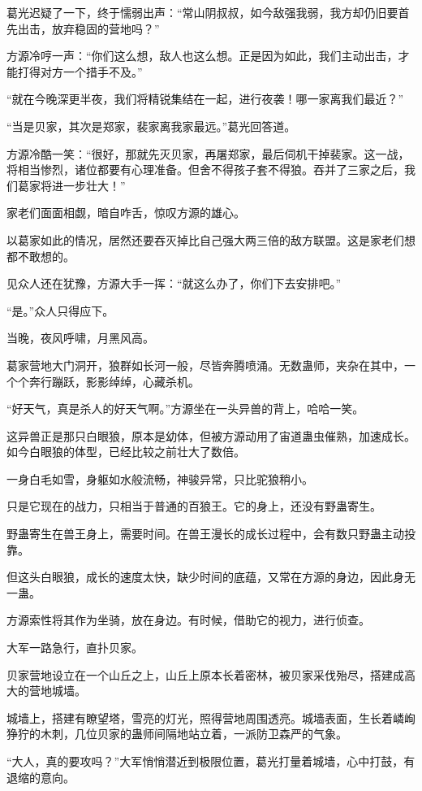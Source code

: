 \begin{this_body}
葛光迟疑了一下，终于懦弱出声：“常山阴叔叔，如今敌强我弱，我方却仍旧要首先出击，放弃稳固的营地吗？”

方源冷哼一声：“你们这么想，敌人也这么想。正是因为如此，我们主动出击，才能打得对方一个措手不及。”

“就在今晚深更半夜，我们将精锐集结在一起，进行夜袭！哪一家离我们最近？”

“当是贝家，其次是郑家，裴家离我家最远。”葛光回答道。

方源冷酷一笑：“很好，那就先灭贝家，再屠郑家，最后伺机干掉裴家。这一战，将相当惨烈，诸位都要有心理准备。但舍不得孩子套不得狼。吞并了三家之后，我们葛家将进一步壮大！”

家老们面面相觑，暗自咋舌，惊叹方源的雄心。

以葛家如此的情况，居然还要吞灭掉比自己强大两三倍的敌方联盟。这是家老们想都不敢想的。

见众人还在犹豫，方源大手一挥：“就这么办了，你们下去安排吧。”

“是。”众人只得应下。

当晚，夜风呼啸，月黑风高。

葛家营地大门洞开，狼群如长河一般，尽皆奔腾喷涌。无数蛊师，夹杂在其中，一个个奔行蹦跃，影影绰绰，心藏杀机。

“好天气，真是杀人的好天气啊。”方源坐在一头异兽的背上，哈哈一笑。

这异兽正是那只白眼狼，原本是幼体，但被方源动用了宙道蛊虫催熟，加速成长。如今白眼狼的体型，已经比较之前壮大了数倍。

一身白毛如雪，身躯如水般流畅，神骏异常，只比驼狼稍小。

只是它现在的战力，只相当于普通的百狼王。它的身上，还没有野蛊寄生。

野蛊寄生在兽王身上，需要时间。在兽王漫长的成长过程中，会有数只野蛊主动投靠。

但这头白眼狼，成长的速度太快，缺少时间的底蕴，又常在方源的身边，因此身无一蛊。

方源索性将其作为坐骑，放在身边。有时候，借助它的视力，进行侦查。

大军一路急行，直扑贝家。

贝家营地设立在一个山丘之上，山丘上原本长着密林，被贝家采伐殆尽，搭建成高大的营地城墙。

城墙上，搭建有瞭望塔，雪亮的灯光，照得营地周围透亮。城墙表面，生长着嶙峋狰狞的木刺，几位贝家的蛊师间隔地站立着，一派防卫森严的气象。

“大人，真的要攻吗？”大军悄悄潜近到极限位置，葛光打量着城墙，心中打鼓，有退缩的意向。


\end{this_body}
